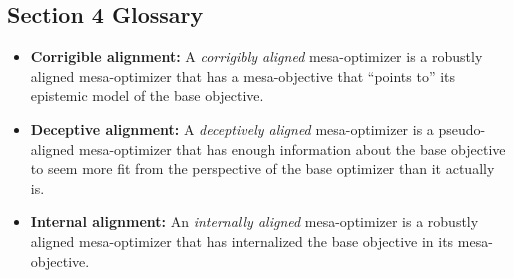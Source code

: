 \documentclass[
  onecolumn,
  natbib,
]{miri-tech-article}
\begin{document}
\subsection{Section 4 Glossary}
\begin{itemize}
\item \textbf{Corrigible alignment:} A \textit{corrigibly aligned} mesa-optimizer is a robustly aligned mesa-optimizer that has a mesa-objective that ``points to'' its epistemic model of the base objective.
\item \textbf{Deceptive alignment:} A \textit{deceptively aligned} mesa-optimizer is a pseudo-aligned mesa-optimizer that has enough information about the base objective to seem more fit from the perspective of the base optimizer than it actually is.
\item \textbf{Internal alignment:} An \textit{internally aligned} mesa-optimizer is a robustly aligned mesa-optimizer that has internalized the base objective in its mesa-objective.
\end{itemize}


\end{document}
